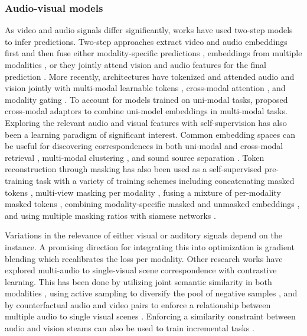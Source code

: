 \subsubsection{Audio-visual models} 


As video and audio signals differ significantly, works have used two-step models to infer predictions. Two-step approaches extract video and audio embeddings first and then fuse either modality-specific predictions \citep{fayek2020large}, embeddings from multiple modalities \citep{xiao2020audiovisual}, or they jointly attend vision and audio features for the final prediction \citep{gong2022uavm}. More recently, architectures have tokenized and attended audio and vision jointly with multi-modal learnable tokens \citep{nagrani2021attention}, cross-modal attention \citep{jaegle2021perceiver}, and modality gating \citep{xue2023dynamic}. To account for models trained on uni-modal tasks, \citet{lin2023vision} proposed cross-modal adaptors to combine uni-model embeddings in multi-modal tasks. Exploring the relevant audio and visual features with self-supervision has also been a learning paradigm of significant interest. Common embedding spaces can be useful for discovering correspondences in both uni-modal and cross-modal retrieval \citep{arandjelovic2018objects,wu2021exploring}, multi-modal clustering \citep{hu2019deep}, and sound source separation \citep{hu2022mix,mo2023unified,zhao2018sound}. Token reconstruction through masking has also been used as a self-supervised pre-training task with a variety of training schemes including concatenating masked tokens \citep{gong2023contrastive}, multi-view masking per modality \citep{huang2023mavil}, fusing a mixture of per-modality masked tokens \citep{guo2024crossmae}, combining modality-specific masked and unmasked embeddings \citep{georgescu2023audiovisual}, and using multiple masking ratios with siamese networks \citep{lin2024siamese}. 

Variations in the relevance of either visual or auditory signals depend on the instance. A promising direction for integrating this into optimization is gradient blending \citep{wang2020makes} which recalibrates the loss per modality. Other research works have explored multi-audio to single-visual scene correspondence with contrastive learning. This has been done by utilizing joint semantic similarity in both modalities \citep{morgado2021audio}, using active sampling to diversify the pool of negative samples
\citep{ma2021active}, and by counterfactual audio and video pairs to enforce a relationship between multiple audio to single visual scenes \citep{singh2024looking}. Enforcing a similarity constraint between audio and vision steams can also be used to train incremental tasks \citep{pian2023audio}.




